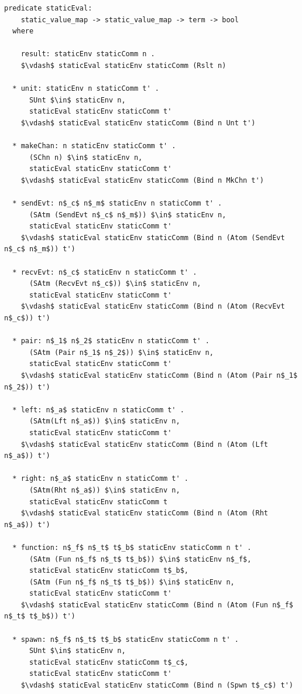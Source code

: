 \documentclass[letterpaper, 11pt]{report}
\begin{document}
\begin{lstlisting}[language=logic, mathescape]
  predicate staticEval:
    static_value_map -> static_value_map -> term -> bool
  where

    result: staticEnv staticComm n .
    $\vdash$ staticEval staticEnv staticComm (Rslt n)

  * unit: staticEnv n staticComm t' .
      SUnt $\in$ staticEnv n,
      staticEval staticEnv staticComm t'
    $\vdash$ staticEval staticEnv staticComm (Bind n Unt t')

  * makeChan: n staticEnv staticComm t' .
      (SChn n) $\in$ staticEnv n,
      staticEval staticEnv staticComm t'
    $\vdash$ staticEval staticEnv staticComm (Bind n MkChn t')

  * sendEvt: n$_c$ n$_m$ staticEnv n staticComm t' .
      (SAtm (SendEvt n$_c$ n$_m$)) $\in$ staticEnv n,
      staticEval staticEnv staticComm t' 
    $\vdash$ staticEval staticEnv staticComm (Bind n (Atom (SendEvt n$_c$ n$_m$)) t')

  * recvEvt: n$_c$ staticEnv n staticComm t' . 
      (SAtm (RecvEvt n$_c$)) $\in$ staticEnv n,
      staticEval staticEnv staticComm t'
    $\vdash$ staticEval staticEnv staticComm (Bind n (Atom (RecvEvt n$_c$)) t')

  * pair: n$_1$ n$_2$ staticEnv n staticComm t' .
      (SAtm (Pair n$_1$ n$_2$)) $\in$ staticEnv n,
      staticEval staticEnv staticComm t'
    $\vdash$ staticEval staticEnv staticComm (Bind n (Atom (Pair n$_1$ n$_2$)) t')

  * left: n$_a$ staticEnv n staticComm t' .
      (SAtm(Lft n$_a$)) $\in$ staticEnv n,
      staticEval staticEnv staticComm t' 
    $\vdash$ staticEval staticEnv staticComm (Bind n (Atom (Lft n$_a$)) t')

  * right: n$_a$ staticEnv n staticComm t' .
      (SAtm(Rht n$_a$)) $\in$ staticEnv n, 
      staticEval staticEnv staticComm t
    $\vdash$ staticEval staticEnv staticComm (Bind n (Atom (Rht n$_a$)) t')

  * function: n$_f$ n$_t$ t$_b$ staticEnv staticComm n t' .
      (SAtm (Fun n$_f$ n$_t$ t$_b$)) $\in$ staticEnv n$_f$, 
      staticEval staticEnv staticComm t$_b$, 
      (SAtm (Fun n$_f$ n$_t$ t$_b$)) $\in$ staticEnv n, 
      staticEval staticEnv staticComm t'
    $\vdash$ staticEval staticEnv staticComm (Bind n (Atom (Fun n$_f$ n$_t$ t$_b$)) t')

  * spawn: n$_f$ n$_t$ t$_b$ staticEnv staticComm n t' .
      SUnt $\in$ staticEnv n, 
      staticEval staticEnv staticComm t$_c$, 
      staticEval staticEnv staticComm t'
    $\vdash$ staticEval staticEnv staticComm (Bind n (Spwn t$_c$) t')


\end{lstlisting}
\end{document}
